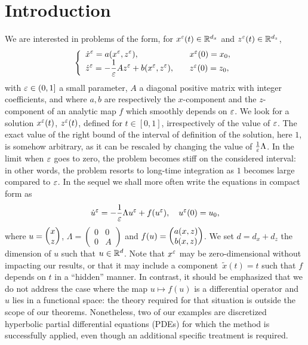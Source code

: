 





\section{Introduction}

We are interested in problems of the form, for $x^{\varepsilon}(t) \in \mathbb{R}^{d_x}$
and $z^{\varepsilon}(t) \in \mathbb{R}^{d_z}$, 
\begin{equation} \label{intro-eq:xz_pb}
\left\{
\begin{array}{ll} \displaystyle
\dot{x}^{\varepsilon} = a(x^{\varepsilon},z^{\varepsilon}), & x^{\varepsilon}(0) = x_0 , 
\\ \displaystyle
\dot{z}^{\varepsilon} = -\frac{1}{\varepsilon} A z^{\varepsilon} + b(x^{\varepsilon}, z^{\varepsilon}), \quad & z^{\varepsilon}(0) = z_0 , 
\end{array} \right.
\end{equation}
with $\varepsilon \in (0,1]$ a small parameter, $A$ a diagonal positive matrix
with integer coefficients, and where $a,b$ are respectively the
$x$-component and the $z$-component of an analytic map $f$ which smoothly
depends on $\varepsilon$. We look for a solution $x^{\varepsilon}(t)$, $z^{\varepsilon}(t)$,
defined for $t \in [0,1]$, irrespectively of the value of $\varepsilon$.  The
exact value of the right bound of the interval of definition of the
solution, here $1$, is somehow arbitrary, as it can be rescaled by
changing the value of $\frac{1}{\varepsilon}\Lambda$. In the limit when $\varepsilon$
goes to zero, the problem becomes stiff on the considered interval: in
other words, the problem resorts to long-time integration as $1$ becomes
large compared to $\varepsilon$. In the sequel we shall more often write the
equations in compact form as 
\begin{equation} \label{intro-pb:full_pb_on_u}
\dot{u}^{\varepsilon} = -\frac{1}{\varepsilon} \Lambda u^{\varepsilon} + f(u^{\varepsilon}), \quad u^{\varepsilon}(0) = u_0,
\end{equation}
where $u = \begin{pmatrix} x \\ z \end{pmatrix}$, $\Lambda = \begin{pmatrix} 0 & 0 \\ 0 & A
\end{pmatrix}$ and $f(u) = \begin{pmatrix} a(x,z) \\ b(x,z) \end{pmatrix}$. We set $d = d_x + d_z$
the dimension of $u$ such that $u \in \mathbb{R}^d$. Note that $x^{\varepsilon}$ may be
zero-dimensional without impacting our results, or that it may include a
component~$\tilde{x}(t) = t$ such that $f$ depends on $t$ in a ``hidden''
manner.
%
In contrast, it should be emphasized that we do not address the case where
the map $u \mapsto f(u)$ is a differential operator and $u$ lies in a
functional space: the theory required for that situation is outside the
scope of our theorems. Nonetheless, two of our examples are discretized
hyperbolic partial differential equations (PDEs) for which the method is
successfully applied, even though an additional  specific treatment is
required. 

